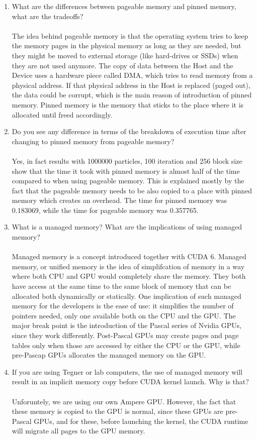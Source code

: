 \documentclass[english]{exam}
\begin{document}
\begin{enumerate}
\item What are the differences between pageable memory and pinned memory, what are the tradeoffs? \\\\
  The idea behind pageable memory is that the operating system tries to keep the memory pages in the physical memory as long as they are needed, but they might be moved to external storage (like hard-drives or SSDs) when they are not used anymore. The copy of data between the Host and the Device uses a hardware piece called DMA, which tries to read memory from a physical address. If that physical address in the Host is replaced (paged out), the data could be corrupt, which is the main reason of introduction of pinned memory. Pinned memory is the memory that sticks to the place where it is allocated until freed accordingly.
  
\item Do you see any difference in terms of the breakdown of execution time after changing to pinned memory from pageable memory? \\\\
  Yes, in fact results with 1000000 particles, 100 iteration and 256 block size show that the time it took with pinned memory is almost half of the time compared to when using pageable memory. This is explained mostly by the fact that the pageable memory needs to be also copied to a place with pinned memory which creates an overhead. The time for pinned memory was 0.183069, while the time for pageable memory was 0.357765.
  
\item What is a managed memory? What are the implications of using managed memory? \\\\
  Managed memory is a concept introduced together with CUDA 6. Managed memory, or unified memory is the idea of simplifcation of memory in a way where both CPU and GPU would completely share the memory. They both have access at the same time to the same block of memory that can be allocated both dynamically or statically. One implication of such managed memory for the developers is the ease of use: it simplifies the number of pointers needed, only one available both on the CPU and the GPU. The major break point is the introduction of the Pascal series of Nvidia GPUs, since they work differently. Post-Pascal GPUs may create pages and page tables only when those are accessed by either the CPU or the GPU, while pre-Pascap GPUs allocates the managed memory on the GPU.
  
\item If you are using Tegner or lab computers, the use of managed memory will result in an implicit memory copy before CUDA kernel launch. Why is that? \\\\
  Unforuntely, we are using our own Ampere GPU. However, the fact that these memory is copied to the GPU is normal, since these GPUs are pre-Pascal GPUs, and for these, before launching the kernel, the CUDA runtime will migrate all pages to the GPU memory.
\end{enumerate}
\end{document}
